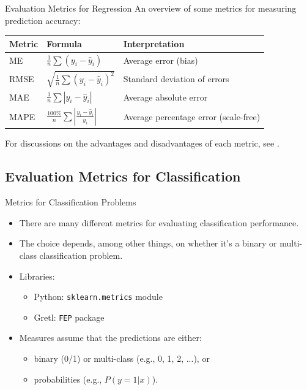 \documentclass[11pt]{beamer}
\begin{document}
\begin{frame}{Evaluation Metrics for Regression}
	An overview of some metrics for measuring prediction accuracy:
	\medskip

	\begin{table}
		\small
		\begin{tabular}{|l|l|l|}
			\hline
			\textbf{Metric} & \textbf{Formula}                                            & \textbf{Interpretation}                    \\
			\hline
			ME 			& $\frac{1}{n} \sum (y_i - \hat{y}_i)$                         & Average error (bias)                      \\
			\hline
			RMSE		   & $\sqrt{\frac{1}{n} \sum (y_i - \hat{y}_i)^2}$                & Standard deviation of errors               \\
			\hline
			MAE             & $\frac{1}{n} \sum |y_i - \hat{y}_i|$                        & Average absolute error                     \\
			\hline
			MAPE			& $\frac{100\%}{n} \sum \left| \frac{y_i - \hat{y}_i}{y_i} \right|$ & Average percentage error (scale-free) \\
			\hline
		\end{tabular}
	\end{table}
	\vspace{0.25cm}

	For discussions on the advantages and disadvantages of each metric, see \citet{hyndman2006AnotherLookMeasures,hyndman2014MeasuringForecastAccuracy}.
\end{frame}

\subsection{Evaluation Metrics for Classification}

\begin{frame}{Metrics for Classification Problems}
    \begin{itemize}
        \item There are many different metrics for evaluating classification performance.
        \item The choice depends, among other things, on whether it's a binary or multi-class classification problem.
        \item Libraries:
			\begin{itemize}
				\item Python: \texttt{sklearn.metrics} module
				\item Gretl: \texttt{FEP} package
			\end{itemize}
        \item Measures assume that the predictions are either:
        \begin{itemize}
            \item binary (0/1) or multi-class (e.g., 0, 1, 2, ...), or
            \item probabilities (e.g., $P(y=1|x)$).
        \end{itemize}
    \end{itemize}
\end{frame}
\end{document}
